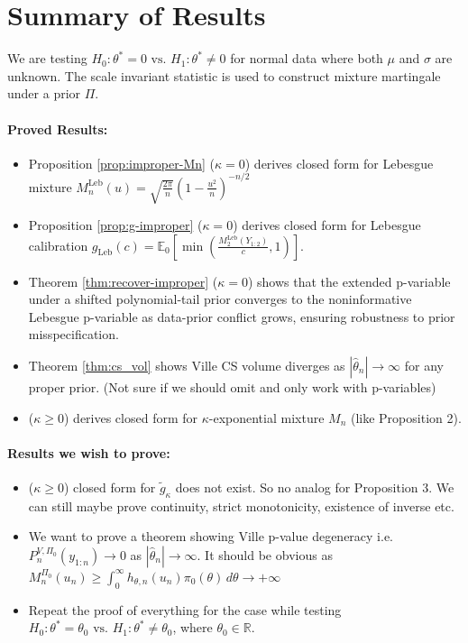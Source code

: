 \documentclass{article}%
\newcommand{\E}{\mathbb{E}}
\begin{document}
\section{Summary of Results}
We are testing 
$H_0:\theta^*=0 \text{ vs. }H_1:\theta^*\neq 0$ for normal data where both $\mu$ and $\sigma$ are unknown. The scale invariant statistic is used to construct mixture martingale under a prior $\Pi$. 

\paragraph{Proved Results:} 
\begin{itemize}
    \item Proposition \ref{prop:improper-Mn} ($\kappa = 0$) derives closed form for Lebesgue mixture $M_n^{\mathrm{Leb}}(u)
=
\sqrt{\frac{2\pi}{n}}
\left(1-\frac{u^2}{n}\right)^{-n/2}$
    \item Proposition \ref{prop:g-improper} ($\kappa = 0$) derives closed form for Lebesgue calibration $g_{\mathrm{Leb}}(c)
=
\E_0\!\left[\min\!\left(\frac{M_2^{\mathrm{Leb}}(Y_{1:2})}{c},1\right)\right]$. 
\item Theorem \ref{thm:recover-improper} ($\kappa = 0$) shows that the extended p-variable under a shifted polynomial-tail prior converges to the noninformative Lebesgue p-variable as data-prior conflict grows, ensuring robustness to prior misspecification.

\item Theorem \ref{thm:cs_vol} shows Ville CS volume diverges as $|\hat{\theta}_n| \to \infty$ for any proper prior. (Not sure if we should omit and only work with p-variables)

\item ($\kappa \geq 0$) derives closed form for $\kappa$-exponential mixture $M_n$ (like Proposition 2). 
\end{itemize}


\paragraph{Results we wish to prove:} 
\begin{itemize}
    \item ($\kappa \geq 0$) closed form for $\tilde{g}_\kappa$ does not exist. So no analog for Proposition 3. We can still maybe prove continuity, strict monotonicity, existence of inverse etc.

    \item We want to prove a theorem showing Ville p-value degeneracy i.e. $P_n^{V,\Pi_0}(y_{1:n}) \to 0$ as $|\hat\theta_n| \to \infty$. It should be obvious as $M_n^{\Pi_0}(u_n) \geq \int_0^\infty h_{\theta,n}(u_n) \pi_0(\theta) \, d\theta \to +\infty$
    \item Repeat the proof of everything for the case while testing $H_0:\theta^*=\theta_0 \text{ vs. }H_1:\theta^*\neq \theta_0$, where $\theta_0 \in \mathbb{R}$.
\end{itemize}
\end{document}
